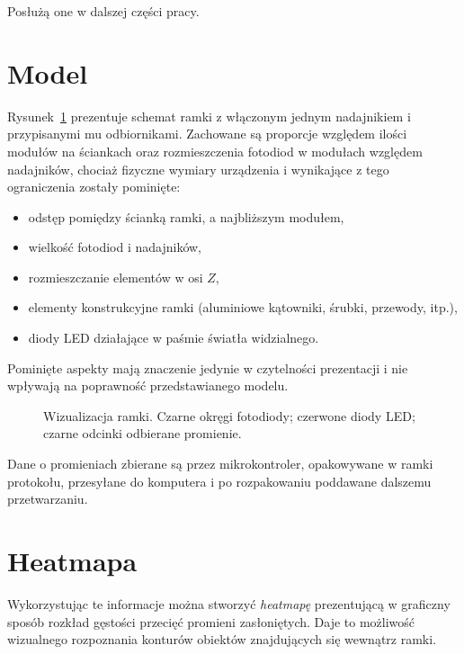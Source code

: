 Posłużą one w dalszej części pracy.\\

\section{Model}

Rysunek~\ref{fig:scene_rays_sample} prezentuje schemat ramki z włączonym jednym nadajnikiem i przypisanymi mu odbiornikami. Zachowane są proporcje względem ilości modułów na ściankach oraz rozmieszczenia fotodiod w modułach względem nadajników, chociaż fizyczne wymiary urządzenia i wynikające z tego ograniczenia zostały pominięte:
\begin{itemize}
 \item odstęp pomiędzy ścianką ramki, a najbliższym modułem,
 \item wielkość fotodiod i nadajników,
 \item rozmieszczanie elementów w osi $Z$,
 \item elementy konstrukcyjne ramki (aluminiowe kątowniki, śrubki, przewody, itp.),
 \item diody LED działające w paśmie światła widzialnego.
\end{itemize}

Pominięte aspekty mają znaczenie jedynie w czytelności prezentacji i nie wpływają na poprawność przedstawianego modelu.

\begin{figure}
 \centering
 \makebox[\textwidth][r]{
  \resizebox{.9\largefigure}{!}{
    \def\svgwidth{0.9\largefigure}
    
  }
 }
 \caption[Wizualizacja ramki]{Wizualizacja ramki. Czarne okręgi \ppauza fotodiody; czerwone \ppauza diody LED; czarne odcinki \ppauza odbierane promienie.}
 \label{fig:scene_rays_sample}
\end{figure}

Dane o promieniach zbierane są przez mikrokontroler, opakowywane w ramki protokołu, przesyłane do komputera i po rozpakowaniu poddawane dalszemu przetwarzaniu.\\

\section{Heatmapa}

Wykorzystując te informacje można stworzyć \textit{heatmapę} prezentującą w graficzny sposób rozkład gęstości przecięć promieni zasłoniętych. Daje to możliwość wizualnego rozpoznania konturów obiektów znajdujących się wewnątrz ramki.

